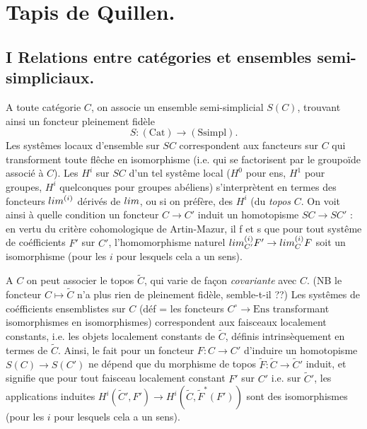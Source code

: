 \documentclass[11pt,a4paper]{article}
\begin{document}
\section*{Tapis de Quillen.}

\subsection*{I \quad Relations entre catégories et ensembles semi-simpliciaux.}

A toute catégorie $C$, on associe un ensemble semi-simplicial $S(C)$,
trouvant ainsi un foncteur pleinement fidèle
\[
S : (\mathrm{Cat}) \longrightarrow (\mathrm{Ssimpl}) .
\]
Les systêmes locaux d'ensemble sur $SC$ correspondent aux fancteurs sur $C$
qui transforment toute flêche en isomorphisme (i.e. qui se factorisent par
le groupoïde associé à $C$). Les $H^i$ sur $SC$ d'un tel systême local
($H^0$ pour ens, $H^1$ pour groupes, $H^i$ quelconques pour groupes
abéliens) s'interprètent en termes des foncteurs
$\varprojlim^{(i)}$ dérivés de $\varprojlim$, ou si on préfère, des $H^i$
(du \emph{topos} $C$. On voit ainsi à quelle condition un foncteur
$C \to C'$ induit un homotopisme $SC \to SC'$ : en vertu du critère
cohomologique de Artin-Mazur, il f et s que pour tout systême de
coéfficients $F'$ sur $C'$, l'homomorphisme naturel
$\varprojlim^{(i)}_{C'} F' \to \varprojlim^{(i)}_{C} F$ soit un
isomorphisme (pour les $i$ pour lesquels cela a un sens).

A $C$ on peut associer le topos $\widetilde{C}$, qui varie de façon
\emph{covariante} avec $C$. (NB le foncteur $C \mapsto \widetilde{C}$ n'a
plus rien de pleinement fidèle, semble-t-il ??) Les systêmes de
coéfficients ensemblistes sur $C$ (déf = les foncteurs
$C^{\circ} \to \mathrm{Ens}$ transformant isomorphismes en
isomorphismes) correspondent aux faisceaux localement constants, i.e. les
objets localement constants de $\widetilde{C}$, définis intrinsèquement en
termes de $\widetilde{C}$. Ainsi, le fait pour un foncteur
$F : C \to C'$ d'induire un homotopisme $S(C) \to S(C')$ ne dépend que du
morphisme de topos $\widetilde{F} : \widetilde{C} \to \widetilde{C}'$
induit, et signifie que pour tout faisceau localement constant $F'$ sur
$C'$ i.e. sur $\widetilde{C}'$, les applications induites
$H^i(\widetilde{C}', F') \to H^i(\widetilde{C}, \widetilde{F}^*(F'))$ sont
des isomorphismes (pour les $i$ pour lesquels cela a un sens).
\end{document}
